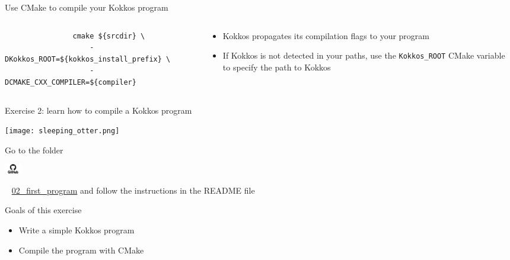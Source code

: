 \documentclass[aspectratio=169]{beamer}
\newcommand{\githublink}[2][2em]{%
    \hspace{-0.25em}%
    \parbox[c][#1][c]{#1}{%
        \includegraphics[width=#1]{GitHub-logo.png}%
    }%
    \hspace{-0.25em}%
    ~%
    #2%
}
\begin{document}

\begin{frame}[fragile]{Use CMake to compile your Kokkos program}
    \begin{columns}
        \begin{column}{0.6\linewidth}
            \begin{verbatim}
                cmake ${srcdir} \
                    -DKokkos_ROOT=${kokkos_install_prefix} \
                    -DCMAKE_CXX_COMPILER=${compiler}
            \end{verbatim}
        \end{column}
        \begin{column}{0.4\linewidth}
            \begin{itemize}
                \item Kokkos propagates its compilation flags to your program
                \item If Kokkos is not detected in your paths, use the \texttt{Kokkos\_ROOT} CMake variable to specify the path to Kokkos
            \end{itemize}
        \end{column}
    \end{columns}
\end{frame}


\begin{frame}[fragile]{Exercise 2: learn how to compile a Kokkos program}
    \begin{center}
        \texttt{[image: sleeping\_otter.png]}
    \end{center}

    Go to the folder \githublink{\href{https://github.com/CExA-project/cexa-kokkos-tutorials/tree/main/exercises/02_first_program}{02\_first\_program}} and follow the instructions in the README file

    \begin{block}{Goals of this exercise}
        \begin{itemize}
            \item Write a simple Kokkos program
            \item Compile the program with CMake
        \end{itemize}
    \end{block}
\end{frame}
\end{document}
